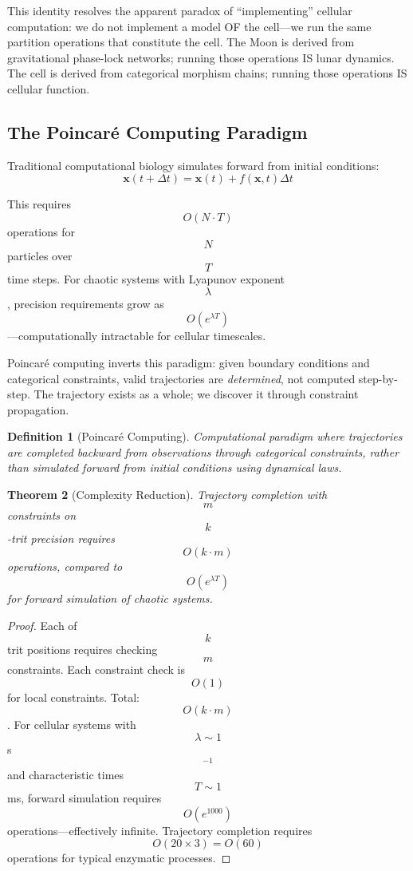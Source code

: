 \documentclass[11pt,twocolumn,a4paper]{article}
\newtheorem{theorem}{Theorem}[section]
\newtheorem{definition}[theorem]{Definition}
\theoremstyle{remark}
\begin{document}
This identity resolves the apparent paradox of ``implementing'' cellular computation: we do not implement a model OF the cell---we run the same partition operations that constitute the cell. The Moon is derived from gravitational phase-lock networks; running those operations IS lunar dynamics. The cell is derived from categorical morphism chains; running those operations IS cellular function.

\subsection{The Poincaré Computing Paradigm}

Traditional computational biology simulates forward from initial conditions:
$$
\mathbf{x}(t + \Delta t) = \mathbf{x}(t) + f(\mathbf{x}, t)\Delta t
$$

This requires $$O(N \cdot T)$$ operations for $$N$$ particles over $$T$$ time steps. For chaotic systems with Lyapunov exponent $$\lambda$$, precision requirements grow as $$O(e^{\lambda T})$$---computationally intractable for cellular timescales.

Poincaré computing inverts this paradigm: given boundary conditions and categorical constraints, valid trajectories are \emph{determined}, not computed step-by-step. The trajectory exists as a whole; we discover it through constraint propagation.

\begin{definition}[Poincaré Computing]
\label{def:poincare_computing}
Computational paradigm where trajectories are completed backward from observations through categorical constraints, rather than simulated forward from initial conditions using dynamical laws.
\end{definition}

\begin{theorem}[Complexity Reduction]
\label{thm:poincare_complexity}
Trajectory completion with $$m$$ constraints on $$k$$-trit precision requires $$O(k \cdot m)$$ operations, compared to $$O(e^{\lambda T})$$ for forward simulation of chaotic systems.
\end{theorem}

\begin{proof}
Each of $$k$$ trit positions requires checking $$m$$ constraints. Each constraint check is $$O(1)$$ for local constraints. Total: $$O(k \cdot m)$$. For cellular systems with $$\lambda \sim 1$$ s$$^{-1}$$ and characteristic times $$T \sim 1$$ ms, forward simulation requires $$O(e^{1000})$$ operations---effectively infinite. Trajectory completion requires $$O(20 \times 3) = O(60)$$ operations for typical enzymatic processes.
\end{proof}
\end{document}
